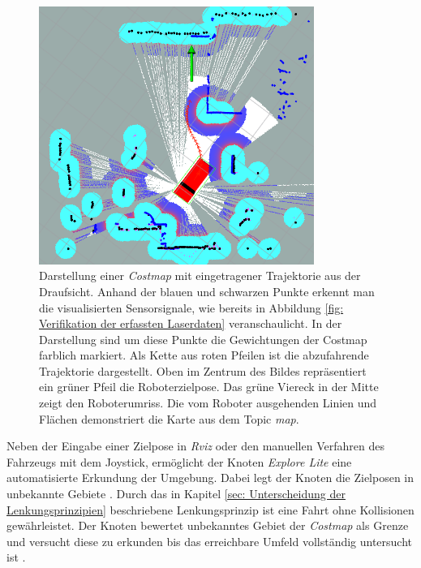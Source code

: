 		    \begin{figure}[H]
		    	\centering
		    	\includegraphics[width=0.8\textwidth]{Bilder/trajektorie.png}
		    	\caption{Darstellung einer \textit{Costmap} mit eingetragener Trajektorie aus der Draufsicht. Anhand der blauen und schwarzen Punkte erkennt man die visualisierten Sensorsignale, wie bereits in Abbildung \ref{fig: Verifikation der erfassten Laserdaten} veranschaulicht. In der Darstellung sind um diese Punkte die Gewichtungen der Costmap farblich markiert. Als Kette aus roten Pfeilen ist die abzufahrende Trajektorie dargestellt. Oben im Zentrum des Bildes repräsentiert ein grüner Pfeil die Roboterzielpose. Das grüne Viereck in der Mitte zeigt den Roboterumriss. Die vom Roboter ausgehenden Linien und Flächen demonstriert die Karte aus dem Topic \textit{map}.}
		    	\label{fig: trajektorie}
		    \end{figure}
	    
	    
	    	Neben der Eingabe einer Zielpose in \textit{Rviz} oder den manuellen Verfahren des Fahrzeugs mit dem Joystick, ermöglicht der Knoten \textit{Explore Lite} eine automatisierte Erkundung der Umgebung. Dabei legt der Knoten die Zielposen in unbekannte Gebiete \cite{explorelite}. Durch das in Kapitel \ref{sec: Unterscheidung der Lenkungsprinzipien} beschriebene Lenkungsprinzip ist eine Fahrt ohne Kollisionen gewährleistet. Der Knoten bewertet unbekanntes Gebiet der \textit{Costmap} als Grenze und versucht diese zu erkunden bis das erreichbare Umfeld vollständig untersucht ist \cite{explorelite}. 
		  

		
			
			
					    
		    